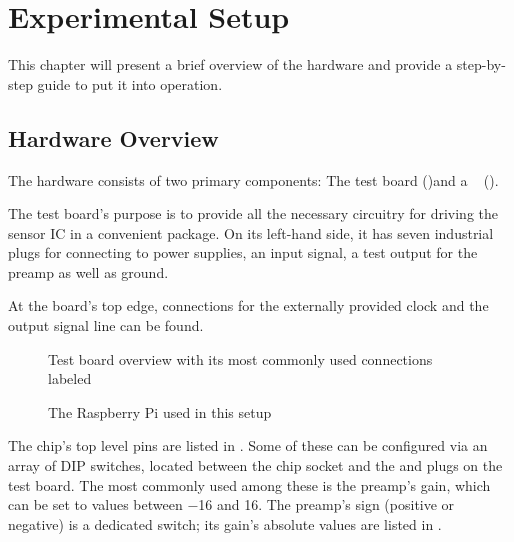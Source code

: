 \chapter{Experimental Setup}
\label{chap:experimentalSetup}

This  chapter will  present a  brief overview  of the  hardware and  provide a
step-by-step guide to put it into operation.

\section{Hardware Overview}
\label{sec:hwOverview}

The   hardware   consists   of   two  primary   components: The   test   board
()and a \raspi~ ().

The test board's purpose is to provide all the necessary circuitry for driving
the sensor  IC in a  convenient package. On its  left-hand side, it  has seven
industrial plugs  for connecting to  power supplies,  an input signal,  a test
output for the preamp as well as ground.

At the board's top edge, connections for the externally provided clock and the
output signal line can be found.

\begin{figure}
    \centering
    
    \caption{Test board overview with its most commonly used connections labeled}
    \label{fig:pcbOverview}
\end{figure}

\begin{figure}
    \centering
    \caption{The Raspberry Pi used in this setup}
    \label{fig:raspi}
\end{figure}

The chip's top  level pins are listed in  . Some of these
can  be configured  via an  array of  DIP switches,  located between  the chip
socket  and  the    and    plugs  on  the  test
board. The most commonly  used among these is the preamp's  gain, which can be
set to values between \num{-16}  and \num{+16}. The preamp's sign (positive or
negative) is  a dedicated  switch; its  gain's absolute  values are  listed in
.

